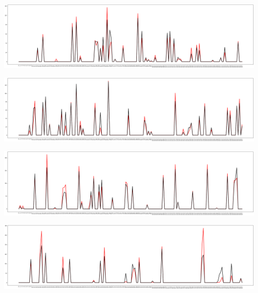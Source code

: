 \includegraphics[scale=0.2]{images/CF_ALS/101.png}

\includegraphics[scale=0.2]{images/CF_ALS/102.png}

\includegraphics[scale=0.2]{images/CF_ALS/103.png}

\includegraphics[scale=0.2]{images/CF_ALS/104.png}
